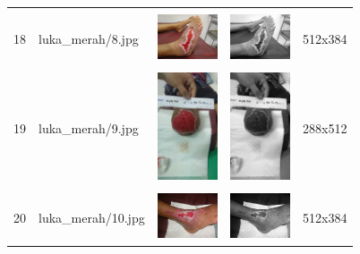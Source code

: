 \begin{table}[H]
\begin{tabular}{|m{0.2in}|m{1.2in}|m{0.7in}|m{0.7in}|m{0.7in}|}
		& &  &  &\\
		18& 
		luka\_merah/8.jpg &
		\includegraphics[width=0.7in]{dataset/dataset_3/luka_merah/ready/8.jpg}&
		\includegraphics[width=0.7in]{dataset/dataset_3/luka_merah/ready/8_gray.jpg}&
		512x384\\
		\hline
		
		& &  &  &\\
		19& 
		luka\_merah/9.jpg &
		\includegraphics[width=0.7in]{dataset/dataset_3/luka_merah/ready/9.jpg}&
		\includegraphics[width=0.7in]{dataset/dataset_3/luka_merah/ready/9_gray.jpg}&
		288x512\\
		\hline
		
		& &  &  &\\
		20& 
		luka\_merah/10.jpg &
		\includegraphics[width=0.7in]{dataset/dataset_3/luka_merah/ready/10.jpg}&
		\includegraphics[width=0.7in]{dataset/dataset_3/luka_merah/ready/10_gray.jpg}&
		512x384\\
		\hline
		

\end{tabular}
\end{table}
